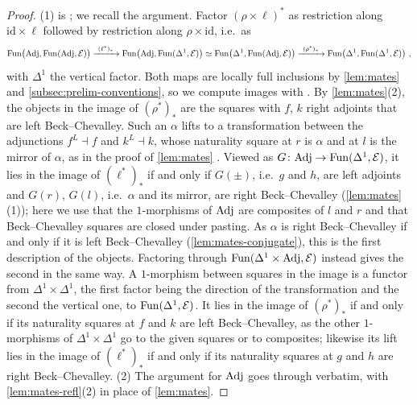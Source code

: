\begin{proof}
%
(1) is \cite[Prop.~2.12(3)]{cnossenlenzlinskens2025universal};
we recall the argument.
Factor
$(\rho \times \ell)^{*}$
as restriction along
$\mathrm{id} \times \ell$
followed by restriction along
$\rho \times \mathrm{id}$,
i.e.\ as
\begin{equation*}
\func\bigl(\Adj,\func(\Adj,\E)\bigr) \xrightarrow{\ (\ell^{*})_{*}\ }
\func\bigl(\Adj,\func(\Delta^{1},\E)\bigr) \simeq
\func\bigl(\Delta^{1},\func(\Adj,\E)\bigr) \xrightarrow{\ (\rho^{*})_{*}\ }
\func\bigl(\Delta^{1},\func(\Delta^{1},\E)\bigr) \ ,
\end{equation*}
with $\Delta^{1}$ the vertical factor. Both maps are locally full inclusions by
\cref{lem:mates} and \cref{subsec:prelim-conventions},
so we compute images with
\cite[Cor.~2.6.6]{abellangagnahaugseng2024straightening}.
By \cref{lem:mates}(2),
the objects in the image of $(\rho^{*})_{*}$ are the squares with $f$,
$k$ right adjoints that are left Beck--Chevalley.
Such an $\alpha$ lifts to a transformation between the adjunctions $f^{L} \dashv
f$ and $k^{L} \dashv k$, whose naturality square at $r$ is $\alpha$ and at $l$
is the mirror of $\alpha$, as in the proof of \cref{lem:mates}
\cite[Cor.~4.9]{haugseng2021laxmonads}. Viewed as
$G\colon \mathrm{Adj} \to \operatorname{Fun}(\Delta^{1},\mathcal{E})$,
it lies in the image of $(\ell^{*})_{*}$ if and only if $G(\pm)$,
i.e.\ $g$ and $h$, are left adjoints and $G(r)$, $G(l)$,
i.e.\ $\alpha$ and its mirror, are right Beck--Chevalley
(\cref{lem:mates}(1));
here we use that the $1$-morphisms of $\mathrm{Adj}$ are composites of $l$ and $r$ and
that Beck--Chevalley squares are closed under pasting.
As $\alpha$ is right Beck--Chevalley if and only if it is left Beck--Chevalley
(\cref{lem:mates-conjugate}), this is the first description of the objects.
Factoring through
$\operatorname{Fun}(\Delta^{1} \times \mathrm{Adj},\mathcal{E})$
instead gives the second in the same way.
A $1$-morphism between squares in the image is a functor from
$\Delta^{1} \times \Delta^{1}$,
the first factor being the direction of the transformation and the second the
vertical one, to $\operatorname{Fun}(\Delta^{1},\mathcal{E})$.
It lies in the image of $(\rho^{*})_{*}$ if and only if its naturality squares
at $f$ and $k$ are left Beck--Chevalley, as the other $1$-morphisms of
$\Delta^{1} \times \Delta^{1}$
go to the given squares or to composites;
likewise its lift lies in the image of $(\ell^{*})_{*}$ if and only if its
naturality squares at $g$ and $h$ are right Beck--Chevalley.
(2) The argument for $\mathrm{Adj}$ goes through verbatim,
with \cref{lem:mates-refl}(2) in place of \cref{lem:mates}.
\end{proof}
